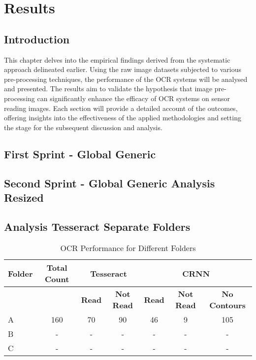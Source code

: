 \chapter{Results}
\label{chap:results}

\section{Introduction}

This chapter delves into the empirical findings derived from the systematic approach delineated earlier. Using the raw image datasets subjected to various pre-processing techniques, the performance of the OCR systems will be analysed and presented. The results aim to validate the hypothesis that image pre-processing can significantly enhance the efficacy of OCR systems on sensor reading images. Each section will provide a detailed account of the outcomes, offering insights into the effectiveness of the applied methodologies and setting the stage for the subsequent discussion and analysis.

\section{First Sprint - Global Generic}
\section{Second Sprint - Global Generic Analysis Resized}
\section{Analysis Tesseract Separate Folders}

\begin{table}[h]
    \centering
    \caption{OCR Performance for Different Folders}
    \label{tab:ocr_performance}
    \begin{tabular}{|l|c|c|c|c|c|c|}
        \hline
        \textbf{Folder} & \textbf{Total Count} & \multicolumn{2}{c|}{\textbf{Tesseract}} & \multicolumn{3}{c|}{\textbf{CRNN}}                                                            \\
        \hline
                        &                      & \textbf{Read}                           & \textbf{Not Read}                  & \textbf{Read} & \textbf{Not Read} & \textbf{No Contours} \\
        \hline
        A               & 160                  & 70                                      & 90                                 & 46            & 9                 & 105                  \\
        B               & -                    & -                                       & -                                  & -             & -                 & -                    \\
        C               & -                    & -                                       & -                                  & -             & -                 & -                    \\
        \hline
    \end{tabular}
\end{table}


